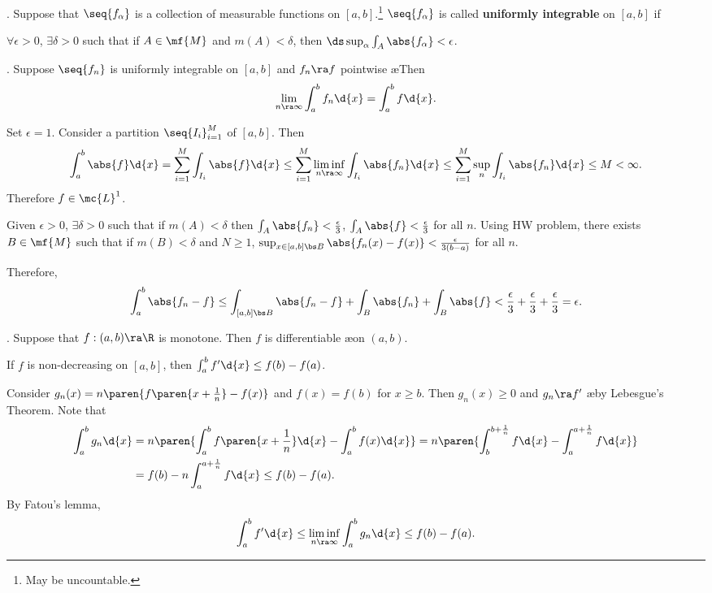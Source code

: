 \pagebreak

.  Suppose that \(\seq{f_\alpha}\) is a collection of measurable functions on \([a, b]\).\footnote{May be uncountable.} \(\seq{f_\alpha}\) is called \textbf{uniformly integrable} on \([a, b]\) if
\begin{center}
    \(\forall \epsilon > 0\), \(\exists \delta > 0\) such that if \(A \in \mf{M}\) and \(m(A) < \delta\), then \(\ds \sup_\alpha \int_A \abs{f_\alpha} < \epsilon\).
\end{center}

\thm.  Suppose \(\seq{f_n}\) is uniformly integrable on \([a, b]\) and \(f_n \ra f\) pointwise \ae Then
\[
    \lim_{n \ra \infty} \int_a^b f_n \d{x} = \int_a^b f \d{x}.
\]

\pf Set \(\epsilon = 1\). Consider a partition \(\seq{I_i}_{i=1}^M\) of \([a, b]\). Then
\[
    \int_a^b \abs{f} \d{x} = \sum_{i=1}^{M} \int_{I_i} \abs{f} \d{x} \leq \sum_{i=1}^{M} \liminf_{n \ra \infty} \int_{I_i} \abs{f_n}\d{x} \leq \sum_{i=1}^{M} \sup_n \int_{I_i} \abs{f_n} \d{x} \leq M < \infty.
\]
Therefore \(f \in \mc{L}^1\).

Given \(\epsilon > 0\), \(\exists \delta > 0\) such that if \(m(A) < \delta\) then \(\int_A \abs{f_n} < \frac{\epsilon}{3}\), \(\int_A \abs{f} < \frac{\epsilon}{3}\) for all \(n\). Using HW problem, there exists \(B \in \mf{M}\) such that if \(m(B) < \delta\) and \(N \geq 1\),  \(\sup_{x \in [a, b]\bs B} \abs{f_n(x) - f(x)} < \frac{\epsilon}{3(b-a)}\) for all \(n\).

Therefore,
\[
    \int_a^b \abs{f_n - f} \leq \int_{[a, b]\bs B} \abs{f_n - f} + \int_B \abs{f_n} + \int_B \abs{f} < \frac{\epsilon}{3} + \frac{\epsilon}{3} + \frac{\epsilon}{3} = \epsilon.
\]

\thm.  Suppose that \(f : (a, b) \ra \R\) is monotone. Then \(f\) is differentiable \ae on \((a, b)\).

\cor If \(f\) is non-decreasing on \([a, b]\), then \(\int_a^b f' \d{x} \leq f(b) - f(a)\).

\pf Consider \(g_n(x) = n \paren{f\paren{x + \frac{1}{n}} - f(x)}\) and \(f(x) = f(b)\) for \(x\geq b\). Then \(g_n(x) \geq 0\) and \(g_n \ra f'\) \ae by Lebesgue's Theorem. Note that
\[
    \begin{aligned}
        \int_a^b g_n \d{x} & = n\paren{\int_a^b f\paren{x + \frac{1}{n}} \d{x} - \int_a^b f(x)\d{x}} = n\paren{\int_b^{b + \frac{1}{n}} f \d{x} - \int_a^{a + \frac{1}{n}} f \d{x}} \\
                           & = f(b) - n \int_a^{a + \frac{1}{n}} f \d{x} \leq f(b) - f(a).
    \end{aligned}
\]
By Fatou's lemma,
\[
    \int_a^b f' \d{x} \leq \liminf_{n \ra \infty} \int_a^b g_n \d{x} \leq f(b) - f(a).
\]

